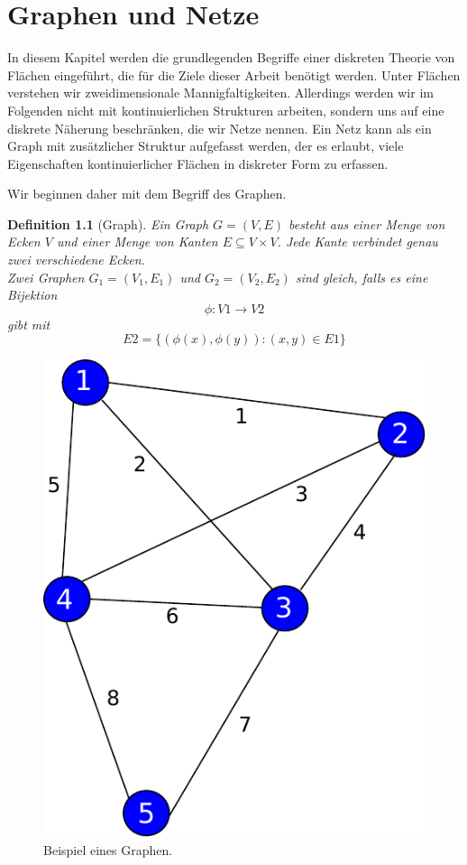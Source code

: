 \documentclass[11pt,a4paper,leqno]{report}
\newtheorem{definition}[theorem]{Definition}
\numberwithin{equation}{chapter}
\begin{document}
\chapter{Graphen und Netze}
	In diesem Kapitel werden die grundlegenden Begriffe einer diskreten Theorie von Flächen eingeführt, die für die Ziele dieser Arbeit benötigt werden. Unter Flächen verstehen wir zweidimensionale Mannigfaltigkeiten. Allerdings werden wir im Folgenden nicht mit kontinuierlichen Strukturen arbeiten, sondern uns auf eine diskrete Näherung beschränken, die wir Netze nennen. Ein Netz kann als ein Graph mit zusätzlicher Struktur aufgefasst werden, der es erlaubt, viele Eigenschaften kontinuierlicher Flächen in diskreter Form zu erfassen.
	
	Wir beginnen daher mit dem Begriff des Graphen.
\begin{definition}[Graph]
Ein Graph $G = (V, E)$ besteht aus einer Menge von Ecken $V$ und einer Menge von Kanten $E \subseteq V \times V$.
Jede Kante verbindet genau zwei verschiedene Ecken.\\
Zwei Graphen $G_1=(V_1,E_1)$ und $G_2=(V_2,E_2)$ sind gleich, falls es eine Bijektion $$\phi : V1 \rightarrow V2$$ gibt mit $$E2 = \{(\phi(x),\phi(y)): (x,y)\in E1\}$$
\end{definition}	
\begin{figure}[H]
	\begin{center}
		\includegraphics[scale=0.4]{Abbildungen/graph_1.pdf}
		\caption{Beispiel eines Graphen.}
	\end{center}
\end{figure}
\end{document}
